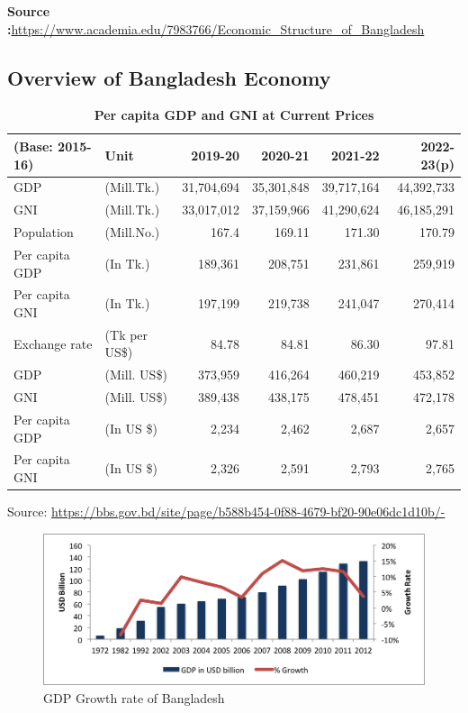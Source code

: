 \textbf{Source :}\url{https://www.academia.edu/7983766/Economic_Structure_of_Bangladesh}

\subsection{Overview of Bangladesh Economy}

\begin{table}[h!]
\renewcommand{\arraystretch}{1.7} %
\caption{\textbf{Per capita GDP and GNI at Current Prices}}
\label{table:1}
\begin{tabular}{l l r r r r}
	\bottomrule
	\rowcolor{gray!30}
	\textbf{(Base: 2015-16)} & Unit & 2019-20 & 2020-21 & 2021-22 & 2022-23(p)\\
	\toprule
	GDP 				& (Mill.Tk.) 	& 31,704,694		& 35,301,848 	& 39,717,164 	& 44,392,733 \\
	GNI 				& (Mill.Tk.) 	& 33,017,012		& 37,159,966 	& 41,290,624 	& 46,185,291 \\
	Population 		& (Mill.No.) 	& 167.4 			& 169.11 		& 171.30 		& 170.79 \\
	Per capita GDP 	& (In Tk.) 		& 189,361 		& 208,751 		& 231,861 		& 259,919 \\
	Per capita GNI 	& (In Tk.) 		& 197,199 		& 219,738 		& 241,047 		& 270,414 \\
	Exchange rate 	& (Tk per US\$)	& 84.78 			& 84.81 			& 86.30 			& 97.81 \\
	GDP				& (Mill. US\$) 	& 373,959 		& 416,264 		& 460,219 		& 453,852 \\
	GNI 				& (Mill. US\$) 	& 389,438 		& 438,175 		& 478,451 		& 472,178 \\
	Per capita GDP 	& (In US \$) 	& 2,234 			& 2,462 			& 2,687 			& 2,657 \\
	Per capita GNI 	& (In US \$) 	& 2,326 			& 2,591 			& 2,793 			& 2,765 \\
	\bottomrule
\end{tabular}
\end{table}

\vfill
Source: \url{https://bbs.gov.bd/site/page/b588b454-0f88-4679-bf20-90e06dc1d10b/-}

\newpage
\begin{figure}[h!]
    \centering
    \includegraphics[width=1.00\textwidth]{Figs/GDP.png}
    \caption{ GDP Growth rate of Bangladesh}
    \label{fig:mesh1}
\end{figure}

